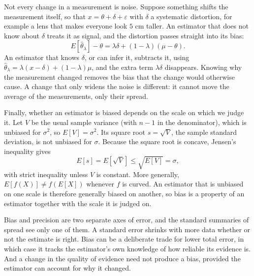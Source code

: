 \documentclass{article}
\begin{document}
Not every change in a measurement is noise. Suppose something shifts the measurement itself, so that $x = \theta + \delta + \varepsilon$ with $\delta$ a systematic distortion, for example a lens that makes everyone look $5$ cm taller. An estimator that does not know about $\delta$ treats it as signal, and the distortion passes straight into its bias:
\begin{equation*}
	E[\hat{\theta}_\lambda] - \theta = \lambda\delta + (1-\lambda)(\mu-\theta).
\end{equation*}
An estimator that knows $\delta$, or can infer it, subtracts it, using $\hat{\theta}_\lambda = \lambda(x-\delta) + (1-\lambda)\mu$, and the extra term $\lambda\delta$ disappears. Knowing why the measurement changed removes the bias that the change would otherwise cause. A change that only widens the noise is different: it cannot move the average of the measurements, only their spread.

Finally, whether an estimator is biased depends on the scale on which we judge it. Let $V$ be the usual sample variance (with $n-1$ in the denominator), which is unbiased for $\sigma^2$, so $E[V]=\sigma^2$. Its square root $s=\sqrt{V}$, the sample standard deviation, is not unbiased for $\sigma$. Because the square root is concave, Jensen's inequality gives
\begin{equation*}
	E[s] = E\!\left[\sqrt{V}\right] \le \sqrt{E[V]} = \sigma ,
\end{equation*}
with strict inequality unless $V$ is constant. More generally, $E[f(X)] \neq f(E[X])$ whenever $f$ is curved. An estimator that is unbiased on one scale is therefore generally biased on another, so bias is a property of an estimator together with the scale it is judged on.

Bias and precision are two separate axes of error, and the standard summaries of spread see only one of them. A standard error shrinks with more data whether or not the estimate is right. Bias can be a deliberate trade for lower total error, in which case it tracks the estimator's own knowledge of how reliable its evidence is. And a change in the quality of evidence need not produce a bias, provided the estimator can account for why it changed.
\end{document}
